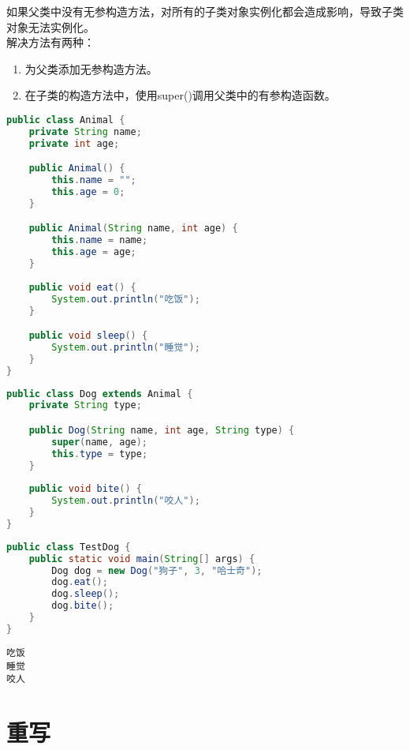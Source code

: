 如果父类中没有无参构造方法，对所有的子类对象实例化都会造成影响，导致子类对象无法实例化。\\

解决方法有两种：

\begin{enumerate}
	\item 为父类添加无参构造方法。
	\item 在子类的构造方法中，使用super()调用父类中的有参构造函数。
\end{enumerate}


\begin{lstlisting}[language=Java, title=Animal.java]
public class Animal {
    private String name;
    private int age;

    public Animal() {
        this.name = "";
        this.age = 0;
    }

    public Animal(String name, int age) {
        this.name = name;
        this.age = age;
    }
    
    public void eat() {
        System.out.println("吃饭");
    }

    public void sleep() {
        System.out.println("睡觉");
    }
}
\end{lstlisting}

\begin{lstlisting}[language=Java, title=Dog.java]
public class Dog extends Animal {
    private String type;

    public Dog(String name, int age, String type) {
        super(name, age);
        this.type = type;
    }
    
    public void bite() {
        System.out.println("咬人");
    }
}
\end{lstlisting}

\begin{lstlisting}[language=Java, title=TestDog.java]
public class TestDog {
    public static void main(String[] args) {
        Dog dog = new Dog("狗子", 3, "哈士奇");
        dog.eat();
        dog.sleep();
        dog.bite();
    }
}
\end{lstlisting}

\begin{tcolorbox}
	\begin{verbatim}
吃饭
睡觉
咬人
	\end{verbatim}
\end{tcolorbox}

\newpage

\section{重写}

